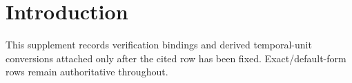 \section{Introduction}
This supplement records verification bindings and derived temporal-unit conversions attached only after the cited row has been fixed. Exact/default-form rows remain authoritative throughout.
